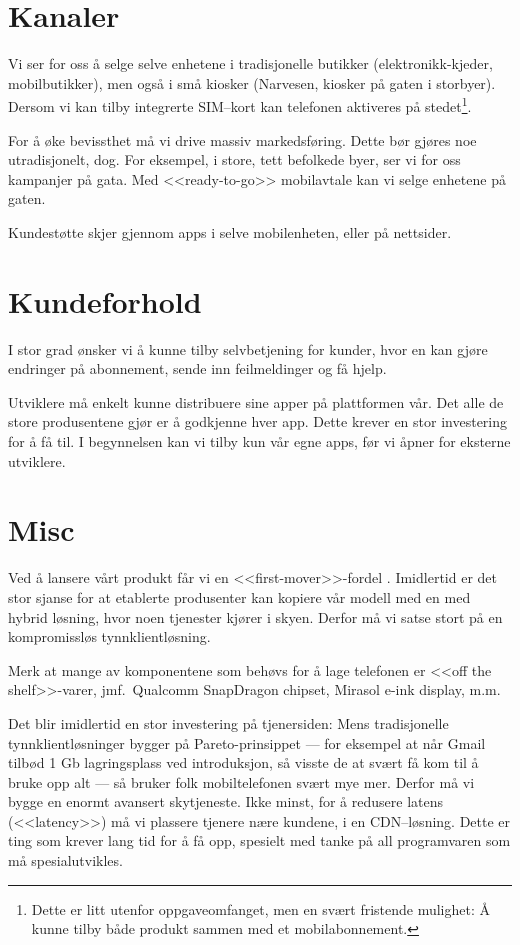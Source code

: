 \section{Kanaler}

Vi ser for oss å selge selve enhetene i tradisjonelle butikker
(elektronikk-kjeder, mobilbutikker), men også i små kiosker (Narvesen, kiosker
på gaten i storbyer). Dersom vi kan tilby integrerte SIM--kort kan telefonen
aktiveres på stedet\footnote{Dette er litt utenfor oppgaveomfanget, men en
svært fristende mulighet: Å kunne tilby både produkt sammen med et
mobilabonnement.}.

For å øke bevissthet må vi drive massiv markedsføring. Dette bør gjøres noe
utradisjonelt, dog. For eksempel, i store, tett befolkede byer, ser vi for oss
kampanjer på gata. Med <<ready-to-go>> mobilavtale kan vi selge enhetene på
gaten.

Kundestøtte skjer gjennom apps i selve mobilenheten, eller på nettsider.

\section{Kundeforhold}

I stor grad ønsker vi å kunne tilby selvbetjening for kunder, hvor en kan gjøre
endringer på abonnement, sende inn feilmeldinger og få hjelp.

Utviklere må enkelt kunne distribuere sine apper på plattformen vår.  Det alle
de store produsentene gjør er å godkjenne hver app. Dette krever en stor
investering for å få til.  I begynnelsen kan vi tilby kun vår egne apps, før vi
åpner for eksterne utviklere.

\section{Misc}

Ved å lansere vårt produkt får vi en <<first-mover>>-fordel \cite{bessant}.
Imidlertid er det stor sjanse for at etablerte produsenter kan kopiere vår
modell med en med hybrid løsning, hvor noen tjenester kjører i skyen. Derfor må
vi satse stort på en kompromissløs tynnklientløsning.

Merk at mange av komponentene som behøvs for å lage telefonen er <<off the
shelf>>-varer, jmf.~Qualcomm SnapDragon chipset, Mirasol e-ink display, m.m.

Det blir imidlertid en stor investering på tjenersiden: Mens tradisjonelle
tynnklientløsninger bygger på Pareto-prinsippet --- for eksempel at når Gmail
tilbød 1 Gb lagringsplass ved introduksjon, så visste de at svært få kom til å
bruke opp alt --- så bruker folk mobiltelefonen svært mye mer. Derfor må vi
bygge en enormt avansert skytjeneste. Ikke minst, for å redusere latens
(<<latency>>) må vi plassere tjenere nære kundene, i en CDN--løsning. Dette er
ting som krever lang tid for å få opp, spesielt med tanke på all programvaren
som må spesialutvikles.

